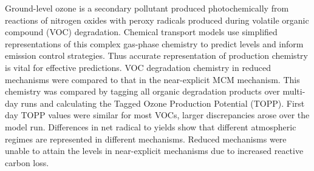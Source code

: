 Ground-level ozone is a secondary pollutant produced photochemically from reactions of nitrogen oxides with peroxy radicals produced during volatile organic compound (VOC) degradation. 
Chemical transport models use simplified representations of this complex gas-phase chemistry to predict  levels and inform emission control strategies. 
Thus accurate representation of  production chemistry is vital for effective predictions.
VOC degradation chemistry in reduced mechanisms were compared to that in the near-explicit MCM mechanism. 
This chemistry was compared by tagging all organic degradation products over multi-day runs and calculating the Tagged Ozone Production Potential (TOPP). 
First day TOPP values were similar for most VOCs, larger discrepancies arose over the model run. 
Differences in net radical to  yields show that different atmospheric regimes are represented in different mechanisms.
Reduced mechanisms were unable to attain the  levels in near-explicit mechanisms due to increased reactive carbon loss.
